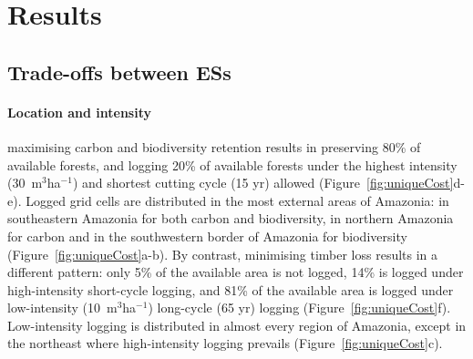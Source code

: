 \documentclass{article}
\begin{document}
\section{Results}

\subsection{Trade-offs between ESs}

\paragraph{Location and intensity}

maximising carbon and biodiversity retention results in preserving 80\% of available forests, and logging 20\% of available forests under the highest intensity (30~m$^3$ha$^{-1}$) and shortest cutting cycle (15 yr) allowed (Figure~\ref{fig:uniqueCost}d-e). Logged grid cells are distributed in the most external areas of Amazonia: in southeastern Amazonia for both carbon and biodiversity, in northern Amazonia for carbon and in the southwestern border of Amazonia for biodiversity (Figure~\ref{fig:uniqueCost}a-b). By contrast, minimising timber loss results in a different pattern: only 5\% of the available area is not logged, 14\% is logged under high-intensity short-cycle logging, and 81\% of the available area is logged under low-intensity (10~m$^3$ha$^{-1}$) long-cycle (65 yr) logging (Figure~\ref{fig:uniqueCost}f). Low-intensity logging is distributed in almost every region of Amazonia, except in the northeast where high-intensity logging prevails (Figure~\ref{fig:uniqueCost}c). 
\end{document}
